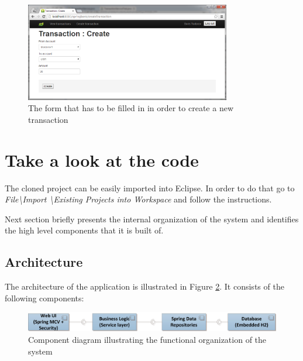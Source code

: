 \documentclass[a4paper, notitlepage]{article}
\begin{document}
\begin{figure}[H]
  \centering
    \includegraphics[width=0.8\textwidth]{new_Screen.png}
    \caption{The form that has to be filled in in order to create a new transaction}
    \label{new}
\end{figure}

\section{Take a look at the code}
The cloned project can be easily imported into Eclipse. In order to do that go to \textit{File\textbackslash Import \textbackslash Existing Projects into Workspace} and follow the instructions.

Next section briefly presents the internal organization of the system and identifies the high level components that it is built of. 

\subsection{Architecture}

The architecture of the application is illustrated in Figure \ref{org}. It consists of the following components:
\bigskip

\begin{figure}[H]
  \centering
    \includegraphics[width=1.3\textwidth]{high_level.jpg}
    \caption{Component diagram illustrating the functional organization of the system}
    \label{org}
\end{figure}
\end{document}
